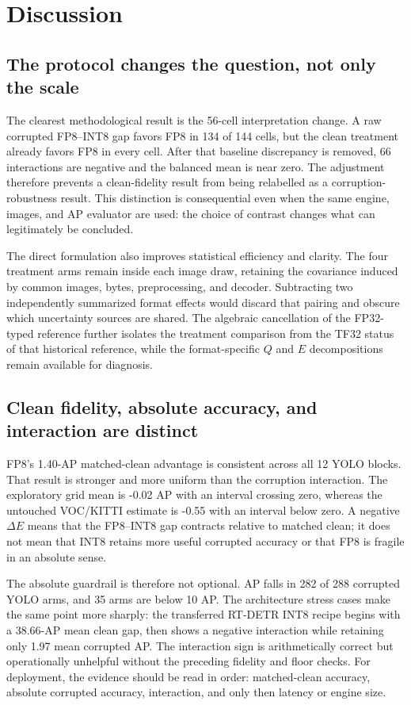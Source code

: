 \section{Discussion}
\label{sec:discussion}

\subsection{The protocol changes the question, not only the scale}

The clearest methodological result is the 56-cell interpretation change. A raw
corrupted FP8--INT8 gap favors FP8 in 134 of 144 cells, but the clean treatment
already favors FP8 in every cell. After that baseline discrepancy is removed,
66 interactions are negative and the balanced mean is near zero. The adjustment
therefore prevents a clean-fidelity result from being relabelled as a
corruption-robustness result. This distinction is consequential even when the
same engine, images, and AP evaluator are used: the choice of contrast changes
what can legitimately be concluded.

The direct formulation also improves statistical efficiency and clarity. The
four treatment arms remain inside each image draw, retaining the covariance
induced by common images, bytes, preprocessing, and decoder. Subtracting two
independently summarized format effects would discard that pairing and obscure
which uncertainty sources are shared. The algebraic cancellation of the
FP32-typed reference further isolates the treatment comparison from the TF32
status of that historical reference, while the format-specific $Q$ and $E$
decompositions remain available for diagnosis.

\subsection{Clean fidelity, absolute accuracy, and interaction are distinct}

FP8's 1.40-AP matched-clean advantage is consistent across all 12 YOLO blocks.
That result is stronger and more uniform than the corruption interaction. The
exploratory grid mean is -0.02 AP with an interval crossing zero, whereas the
untouched VOC/KITTI estimate is -0.55 with an interval below zero. A negative
$\Delta E$ means that the FP8--INT8 gap contracts relative to matched clean; it
does not mean that INT8 retains more useful corrupted accuracy or that FP8 is
fragile in an absolute sense.

The absolute guardrail is therefore not optional. AP falls in 282 of 288
corrupted YOLO arms, and 35 arms are below 10 AP. The architecture stress cases
make the same point more sharply: the transferred RT-DETR INT8 recipe begins
with a 38.66-AP mean clean gap, then shows a negative interaction while
retaining only 1.97 mean corrupted AP. The interaction sign is arithmetically
correct but operationally unhelpful without the preceding fidelity and floor
checks. For deployment, the evidence should be read in order: matched-clean
accuracy, absolute corrupted accuracy, interaction, and only then latency or
engine size.

